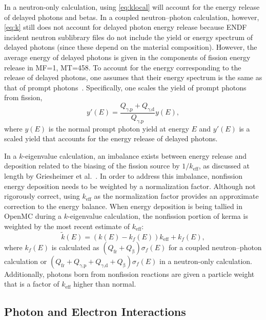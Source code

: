 \documentclass{anstrans}
\newcommand{\efr}{Q_\text{fr}}
\newcommand{\egp}{Q_\text{$\gamma$,p}}
\newcommand{\egd}{Q_\text{$\gamma$,d}}
\newcommand{\eb}{Q_\upbeta}
\begin{document}
In a neutron-only calculation, using \cref{eq:klocal} will account for the
energy release of delayed photons and betas. In a coupled neutron--photon
calculation, however, \cref{eq:k} still does not account for delayed photon
energy release because ENDF incident neutron sublibrary files do not include the
yield or energy spectrum of delayed photons (since these depend on the material
composition). However, the average energy of delayed photons is given in the
components of fission energy release in MF=1, MT=458. To account for the energy
corresponding to the release of delayed photons, one assumes that their energy
spectrum is the same as that of prompt photons~\cite{tuominen2019ane}.
Specifically, one scales the yield of prompt photons from fission,
\begin{equation}
    y'(E) = \frac{\egp + \egd}{\egp} y(E),
\end{equation}
where $y(E)$ is the normal prompt photon yield at energy $E$ and $y'(E)$ is a
scaled yield that accounts for the energy release of delayed photons.

In a $k$-eigenvalue calculation, an imbalance exists between energy release and
deposition related to the biasing of the fission source by $1/k_\text{eff}$, as
discussed at length by Griesheimer et al.~\cite{griesheimer2020physor}. In order
to address this imbalance, nonfission energy deposition needs to be weighted by
a normalization factor. Although not rigorously correct, using $k_\text{eff}$ as
the normalization factor provides an approximate correction to the energy
balance. When energy deposition is being tallied in OpenMC during a
$k$-eigenvalue calculation, the nonfission portion of kerma is weighted by the
most recent estimate of $k_\text{eff}$:
\begin{equation}
    \tilde{k}(E) = \left ( k(E) - k_f(E) \right) k_\text{eff} + k_f(E),
\end{equation}
where $k_f(E)$ is calculated as $\left ( \efr + \eb \right ) \sigma_f(E)$ for a
coupled neutron--photon calculation or $\left ( \efr + \egp + \egd + \eb \right)
\sigma_f(E)$ in a neutron-only calculation. Additionally, photons born from
nonfission reactions are given a particle weight that is a factor of
$k_\text{eff}$ higher than normal.


\subsection{Photon and Electron Interactions}
\end{document}
